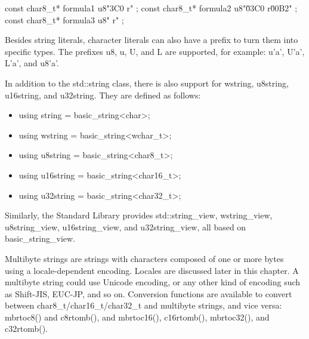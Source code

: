 \begin{cpp}
const char8_t* formula1 { u8"\x3C0 r" };
const char8_t* formula2 { u8"\u03C0 r\u00B2" };
const char8_t* formula3 { u8" r" };
\end{cpp}

Besides string literals, character literals can also have a prefix to turn them into specific types. The prefixes u8, u, U, and L are supported, for example: u'a', U'a', L'a', and u8'a'.

In addition to the std::string class, there is also support for wstring, u8string, u16string, and u32string. They are defined as follows:

\begin{itemize}
\item
\begin{cpp}
using string = basic_string<char>;
\end{cpp}

\item
\begin{cpp}
using wstring = basic_string<wchar_t>;
\end{cpp}

\item
\begin{cpp}
using u8string = basic_string<char8_t>;
\end{cpp}

\item
\begin{cpp}
using u16string = basic_string<char16_t>;
\end{cpp}

\item
\begin{cpp}
using u32string = basic_string<char32_t>;
\end{cpp}
\end{itemize}

Similarly, the Standard Library provides std::string\_view, wstring\_view, u8string\_view, u16string\_view, and u32string\_view, all based on basic\_string\_view.

Multibyte strings are strings with characters composed of one or more bytes using a locale-dependent encoding. Locales are discussed later in this chapter. A multibyte string could use Unicode encoding, or any other kind of encoding such as Shift-JIS, EUC-JP, and so on. Conversion functions are available to convert between char8\_t/char16\_t/char32\_t and multibyte strings, and vice versa: mbrtoc8() and c8rtomb(), and mbrtoc16(), c16rtomb(), mbrtoc32(), and c32rtomb().

